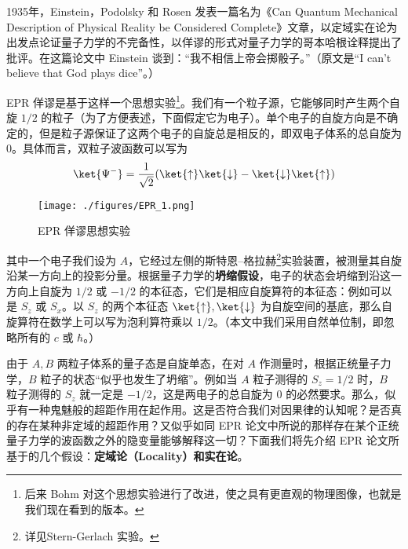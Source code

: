 
1935年，Einstein，Podolsky 和 Rosen 发表一篇名为《Can Quantum Mechanical Description of Physical Reality be Considered Complete》文章，以定域实在论为出发点论证量子力学的不完备性，以佯谬的形式对量子力学的哥本哈根诠释提出了批评。在这篇论文中 Einstein 谈到：“我不相信上帝会掷骰子。”（原文是“I can't believe that God plays dice”。） 

EPR 佯谬是基于这样一个思想实验\footnote{后来 Bohm 对这个思想实验进行了改进，使之具有更直观的物理图像，也就是我们现在看到的版本。}。我们有一个粒子源，它能够同时产生两个自旋 $1/2$ 的粒子（为了方便表述，下面假定它为电子）。单个电子的自旋方向是不确定的，但是粒子源保证了这两个电子的自旋总是相反的，即双电子体系的总自旋为 $0$。具体而言，双粒子波函数可以写为
\begin{equation}
\ket{\Psi^-}=\frac{1}{\sqrt{2}}(\ket{\uparrow}\ket{\downarrow}-\ket{\downarrow}\ket{\uparrow})
\end{equation}

\begin{figure}[ht]
\centering
\texttt{[image: ./figures/EPR\_1.png]}
\caption{EPR 佯谬思想实验} \label{EPR_fig1}
\end{figure}

其中一个电子我们设为 $A$，它经过左侧的斯特恩–格拉赫\footnote{详见Stern-Gerlach 实验。}实验装置，被测量其自旋沿某一方向上的投影分量。根据量子力学的\textbf{坍缩假设}，电子的状态会坍缩到沿这一方向上自旋为 $1/2$ 或 $-1/2$ 的本征态，它们是相应自旋算符的本征态：例如可以是 $S_z$ 或 $S_x$。以 $S_z$ 的两个本征态 $\ket{\uparrow},\ket{\downarrow}$ 为自旋空间的基底，那么自旋算符在数学上可以写为泡利算符乘以 $1/2$。（本文中我们采用自然单位制，即忽略所有的 $c$ 或 $\hbar$。）

由于 $A,B$ 两粒子体系的量子态是自旋单态，在对 $A$ 作测量时，根据正统量子力学，$B$ 粒子的状态“似乎也发生了坍缩”。例如当 $A$ 粒子测得的 $S_z=1/2$ 时，$B$ 粒子测得的 $S_z$ 就一定是 $-1/2$，这是两电子的总自旋为 $0$ 的必然要求。那么，似乎有一种鬼魅般的超距作用在起作用。这是否符合我们对因果律的认知呢？是否真的存在某种非定域的超距作用？又似乎如同 EPR 论文中所说的那样存在某个正统量子力学的波函数之外的隐变量能够解释这一切？下面我们将先介绍 EPR 论文所基于的几个假设：\textbf{定域论（Locality）和实在论}。

